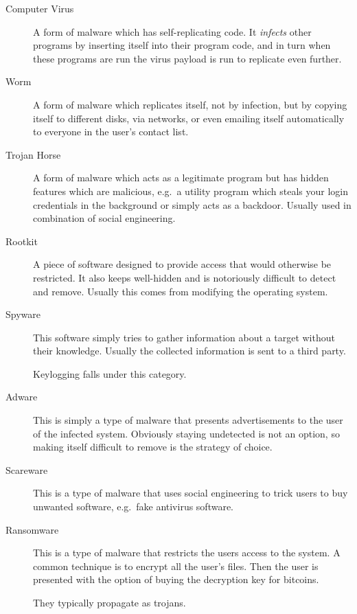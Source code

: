 \begin{frame}[allowframebreaks]
  \begin{description}
    \item[Computer Virus]
      A form of malware which has self-replicating code.
      It \emph{infects} other programs by inserting itself into their program 
      code, and in turn when these programs are run the virus payload is run to 
      replicate even further.

    \item[Worm]
      A form of malware which replicates itself, not by infection, but by 
      copying itself to different disks, via networks, or even emailing itself 
      automatically to everyone in the user's contact list.

    \item[Trojan Horse]
      A form of malware which acts as a legitimate program but has hidden 
      features which are malicious, e.g.\ a utility program which steals your 
      login credentials in the background or simply acts as a backdoor.
      Usually used in combination of social engineering.

    \item[Rootkit]
      A piece of software designed to provide access that would otherwise be 
      restricted.
      It also keeps well-hidden and is notoriously difficult to detect and 
      remove.
      Usually this comes from modifying the operating system.

    \item[Spyware]
      This software simply tries to gather information about a target without 
      their knowledge.
      Usually the collected information is sent to a third party.

      Keylogging falls under this category.

    \item[Adware]
      This is simply a type of malware that presents advertisements to the user
      of the infected system.
      Obviously staying undetected is not an option, so making itself difficult
      to remove is the strategy of choice.

    \item[Scareware]
      This is a type of malware that uses social engineering to trick users to 
      buy unwanted software, e.g.\ fake antivirus software.

    \item[Ransomware]
      This is a type of malware that restricts the users access to the system.
      A common technique is to encrypt all the user's files.
      Then the user is presented with the option of buying the decryption key 
      for bitcoins.

      They typically propagate as trojans.

  \end{description}
\end{frame}



